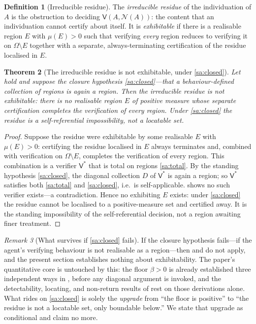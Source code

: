 \documentclass[11pt,twocolumn,a4paper]{article}
\theoremstyle{thmstyle}
\newtheorem{theorem}{Theorem}[section]
\theoremstyle{definition}
\newtheorem{definition}[theorem]{Definition}
\theoremstyle{remark}
\newtheorem{remark}[theorem]{Remark}
\newcommand{\Space}{\Omega}
\newcommand{\thick}{\beta}
\newcommand{\Neg}{\mathcal{N}}
\newcommand{\Ver}{\mathsf{V}}
\begin{document}
\begin{definition}[Irreducible residue]
\label{def:irreducible}
The \emph{irreducible residue} of the individuation of $A$ is the obstruction to
deciding $\Ver(A,\Neg(A))$: the content that an individuation cannot certify
about itself. It is \emph{exhibitable} if there is a realisable region $E$ with
$\mu(E)>0$ such that verifying \emph{every} region reduces to verifying it on
$\Space\setminus E$ together with a separate, always-terminating certification of
the residue localised in $E$.
\end{definition}

\begin{theorem}[The irreducible residue is not exhibitable, under \ref{sa:closed}]
\label{thm:residue-not-measure}
Let  hold and suppose the closure hypothesis \ref{sa:closed}---that
a behaviour-defined collection of regions is again a region. Then the irreducible
residue is not exhibitable: there is no realisable region $E$ of positive measure
whose separate certification completes the verification of every region. Under
\ref{sa:closed} the residue is a self-referential impossibility, not a locatable
set.
\end{theorem}

\begin{proof}
Suppose the residue were exhibitable by some realisable $E$ with $\mu(E)>0$:
certifying the residue localised in $E$ always terminates and, combined with
verification on $\Space\setminus E$, completes the verification of every region.
This combination is a verifier $\Ver^\ast$ that is total on regions
\ref{sa:total}. By the standing hypothesis \ref{sa:closed}, the diagonal
collection $D$ of $\Ver^\ast$ is again a region; so $\Ver^\ast$ satisfies both
\ref{sa:total} and \ref{sa:closed}, i.e.\ is self-applicable. 
shows no such verifier exists---a contradiction. Hence no exhibiting $E$ exists:
under \ref{sa:closed} the residue cannot be localised to a positive-measure set
and certified away. It is the standing impossibility of the self-referential
decision, not a region awaiting finer treatment.
\end{proof}

\begin{remark}[What survives if \ref{sa:closed} fails]
\label{rem:if-sa-fails}
If the closure hypothesis fails---if the agent's verifying behaviour is not
realisable as a region---then  and 
do not apply, and the present section establishes nothing about exhibitability. The
paper's quantitative core is untouched by this: the floor $\thick>0$ is already
established three independent ways in , before any
diagonal argument is invoked, and the detectability, locating, and non-return
results of  rest on those derivations
alone. What rides on \ref{sa:closed} is solely the \emph{upgrade} from ``the floor
is positive'' to ``the residue is not a locatable set, only boundable below.'' We
state that upgrade as conditional and claim no more.
\end{remark}
\end{document}
